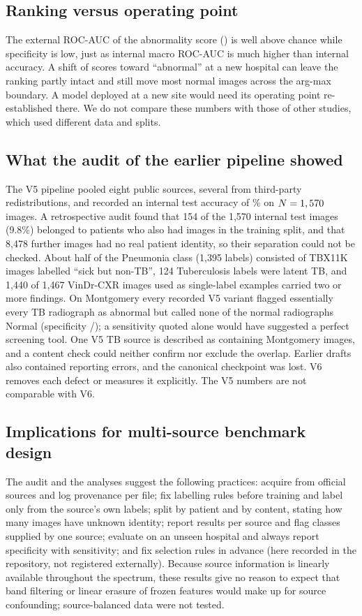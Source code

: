 \subsection{Ranking versus operating point}
The external ROC-AUC of the abnormality score (\RExtAUC) is well above chance while specificity is low, just as internal macro ROC-AUC is much higher than internal accuracy. A shift of scores toward ``abnormal'' at a new hospital can leave the ranking partly intact and still move most normal images across the arg-max boundary. A model deployed at a new site would need its operating point re-established there. We do not compare these numbers with those of other studies, which used different data and splits.

\subsection{What the audit of the earlier pipeline showed}
\label{sec:disc-audit}
The V5 pipeline pooled eight public sources, several from third-party redistributions, and recorded an internal test accuracy of \RVFiveAcc\% on $N=1,570$ images. A retrospective audit found that 154 of the 1,570 internal test images (9.8\%) belonged to patients who also had images in the training split, and that 8,478 further images had no real patient identity, so their separation could not be checked. About half of the Pneumonia class (1,395 labels) consisted of TBX11K images labelled ``sick but non-TB'', 124 Tuberculosis labels were latent TB, and 1,440 of 1,467 VinDr-CXR images used as single-label examples carried two or more findings. On Montgomery every recorded V5 variant flagged essentially every TB radiograph as abnormal but called none of the normal radiographs Normal (specificity \RVFiveExtSpecK/\RVFiveExtSpecN); a sensitivity quoted alone would have suggested a perfect screening tool. One V5 TB source is described as containing Montgomery images, and a content check could neither confirm nor exclude the overlap. Earlier drafts also contained reporting errors, and the canonical checkpoint was lost. V6 removes each defect or measures it explicitly. The V5 numbers are not comparable with V6.

\subsection{Implications for multi-source benchmark design}
The audit and the analyses suggest the following practices: acquire from official sources and log provenance per file; fix labelling rules before training and label only from the source's own labels; split by patient and by content, stating how many images have unknown identity; report results per source and flag classes supplied by one source; evaluate on an unseen hospital and always report specificity with sensitivity; and fix selection rules in advance (here recorded in the repository, not registered externally). Because source information is linearly available throughout the spectrum, these results give no reason to expect that band filtering or linear erasure of frozen features would make up for source confounding; source-balanced data were not tested.


